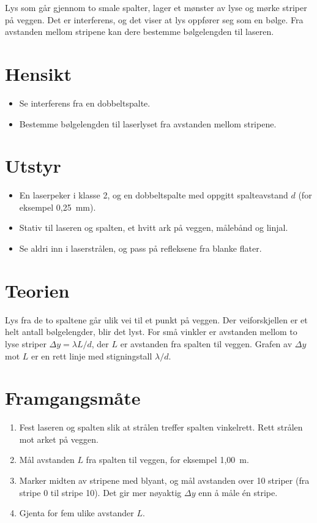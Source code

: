 \documentclass[11pt]{article}
\begin{document}

Lys som går gjennom to smale spalter, lager et mønster av lyse og mørke striper på veggen. Det er interferens, og det viser at lys oppfører seg som en bølge. Fra avstanden mellom stripene kan dere bestemme bølgelengden til laseren.

\section*{Hensikt}

\begin{itemize}
\item Se interferens fra en dobbeltspalte.
\item Bestemme bølgelengden til laserlyset fra avstanden mellom stripene.
\end{itemize}

\section*{Utstyr}

\begin{itemize}
\item En laserpeker i klasse 2, og en dobbeltspalte med oppgitt spalteavstand $d$ (for eksempel 0,25~mm).
\item Stativ til laseren og spalten, et hvitt ark på veggen, målebånd og linjal.
\item Se aldri inn i laserstrålen, og pass på refleksene fra blanke flater.
\end{itemize}

\section*{Teorien}

Lys fra de to spaltene går ulik vei til et punkt på veggen. Der veiforskjellen er et helt antall bølgelengder, blir det lyst. For små vinkler er avstanden mellom to lyse striper $Δy = λL/d$, der $L$ er avstanden fra spalten til veggen. Grafen av $Δy$ mot $L$ er en rett linje med stigningstall $λ/d$.

\section*{Framgangsmåte}

\begin{enumerate}
\item Fest laseren og spalten slik at strålen treffer spalten vinkelrett. Rett strålen mot arket på veggen.
\item Mål avstanden $L$ fra spalten til veggen, for eksempel 1,00~m.
\item Marker midten av stripene med blyant, og mål avstanden over 10 striper (fra stripe 0 til stripe 10). Det gir mer nøyaktig $Δy$ enn å måle én stripe.
\item Gjenta for fem ulike avstander $L$.
\end{enumerate}
\end{document}
